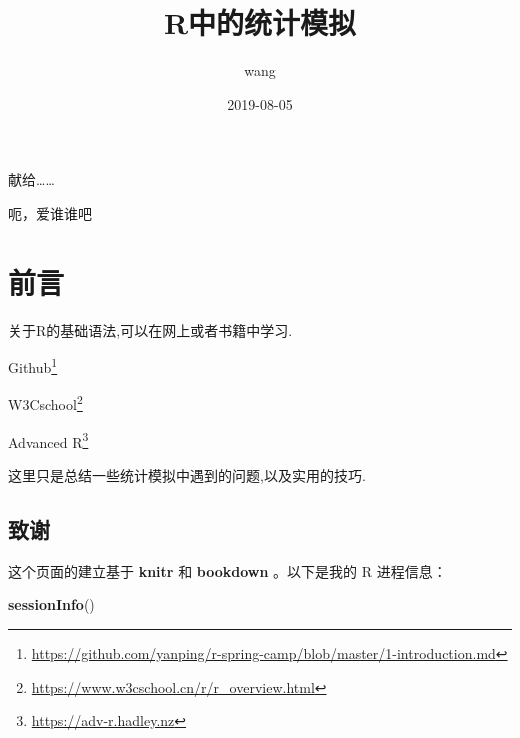 \documentclass[]{ctexbook}
\title{R中的统计模拟}
\author{wang}
\date{2019-08-05}
\newenvironment{Shaded}{\begin{snugshade}}{\end{snugshade}}
\newcommand{\KeywordTok}[1]{\textcolor[rgb]{0.13,0.29,0.53}{\textbf{#1}}}
\newcommand{\NormalTok}[1]{#1}
\renewcommand{\href}[2]{#2\footnote{\url{#1}}}
\begin{document}
\maketitle


\thispagestyle{empty}

\begin{center}
献给……

呃，爱谁谁吧
\end{center}

\setlength{\abovedisplayskip}{-5pt}
\setlength{\abovedisplayshortskip}{-5pt}

{
\setcounter{tocdepth}{2}
\tableofcontents
}
\listoftables
\listoffigures
\hypertarget{section}{%
\chapter*{前言}\label{section}}


关于R的基础语法,可以在网上或者书籍中学习.

\href{https://github.com/yanping/r-spring-camp/blob/master/1-introduction.md}{Github}

\href{https://www.w3cschool.cn/r/r_overview.html}{W3Cschool}

\href{https://adv-r.hadley.nz}{Advanced R}

这里只是总结一些统计模拟中遇到的问题,以及实用的技巧.

\hypertarget{section-1}{%
\section*{致谢}\label{section-1}}


这个页面的建立基于 \textbf{knitr} \citep{xie2015}和 \textbf{bookdown} \citep{R-bookdown}。以下是我的 R 进程信息：

\begin{Shaded}
\begin{Highlighting}[]
\KeywordTok{sessionInfo}\NormalTok{()}
\end{Highlighting}
\end{Shaded}
\end{document}
